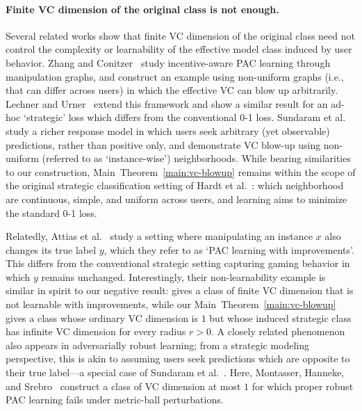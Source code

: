 \documentclass[11pt]{article}
\theoremstyle{plain}
\theoremstyle{definition}
\theoremstyle{remark}
\begin{document}
\paragraph{Finite VC dimension of the original class is not enough.}
Several related works show that finite VC dimension of the original class need not control the complexity or learnability of the effective model class induced by user behavior.
Zhang and Conitzer~\cite{zhang2021incentive} study incentive-aware PAC learning through manipulation graphs,
and construct an example using non-uniform graphs (i.e., that can differ across users)
in which the effective VC can blow up arbitrarily.
Lechner and Urner~\cite{lechner2022learning} extend this framework 
and show a similar result for an ad-hoc `strategic' loss which differs from the conventional 0-1 loss.
Sundaram et al.~\cite{sundaram2023pac} study a richer response model in which users 
seek arbitrary (yet observable) predictions, rather than positive only,
and demonstrate VC blow-up using non-uniform (referred to as `instance-wise') neighborhoods.
While bearing similarities to our construction, 
Main~Theorem~\ref{main:vc-blowup} remains within the scope of the original strategic classification setting of Hardt et al.~\cite{hardt2016strategic}:
which neighborhood are continuous, simple, and uniform across users,
and learning aims to minimize the standard 0-1 loss.

Relatedly, Attias et al.~\cite{attias25a} study a setting where manipulating an instance $x$ also changes its true label $y$,
which they refer to as `PAC learning with improvements'.
This differs from the conventional strategic setting capturing gaming behavior in which $y$ remains unchanged.
Interestingly,
their non-learnability example is similar in spirit to our negative result: \cite[Example~2]{attias25a} gives a class of finite VC dimension that is not learnable with improvements, while our Main~Theorem~\ref{main:vc-blowup} gives a class whose ordinary VC dimension is $1$ but whose induced strategic class has infinite VC dimension for every radius $r>0$.
A closely related phenomenon also appears in adversarially robust learning;
from a strategic modeling perspective, this is akin to assuming users seek predictions
which are opposite to their true label---a special case of Sundaram et al.~\cite{sundaram2023pac}.
Here, Montasser, Hanneke, and Srebro~\citep{montasser19} construct a class of VC dimension at most $1$ for which proper robust PAC learning fails under metric-ball perturbations.

\end{document}
